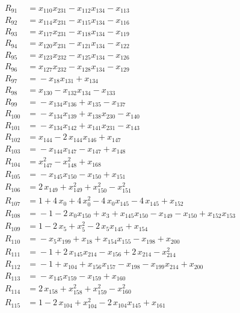 \begin{align*}
R_{91} &={} x_{110} x_{231} -x_{112} x_{134} -x_{113} \\[2pt]
R_{92} &={} x_{114} x_{231} -x_{115} x_{134} -x_{116} \\[2pt]
R_{93} &={} x_{117} x_{231} -x_{118} x_{134} -x_{119} \\[2pt]
R_{94} &={} x_{120} x_{231} -x_{121} x_{134} -x_{122} \\[2pt]
R_{95} &={} x_{123} x_{232} -x_{125} x_{134} -x_{126} \\[2pt]
R_{96} &={} x_{127} x_{232} -x_{128} x_{134} -x_{129} \\[2pt]
R_{97} &={} -x_{18} x_{131} +x_{134} \\[2pt]
R_{98} &={} x_{130} -x_{132} x_{134} -x_{133} \\[2pt]
R_{99} &={} -x_{134} x_{136} +x_{135} -x_{137} \\[2pt]
R_{100} &={} -x_{134} x_{139} +x_{138} x_{230} -x_{140} \\[2pt]
R_{101} &={} -x_{134} x_{142} +x_{141} x_{231} -x_{143} \\[2pt]
R_{102} &={} x_{144} -2\,x_{144} x_{146} +x_{147} \\[2pt]
R_{103} &={} -x_{144} x_{147} -x_{147} +x_{148} \\[2pt]
R_{104} &={} x_{147}^{2} -x_{148}^{2} +x_{168} \\[2pt]
R_{105} &={} -x_{145} x_{150} -x_{150} +x_{151} \\[2pt]
R_{106} &={} 2\,x_{149} +x_{149}^{2} +x_{150}^{2} -x_{151}^{2} \\[2pt]
R_{107} &={} 1 +4\,x_{0} +4\,x_{0}^{2} -4\,x_{0} x_{145} -4\,x_{145} +x_{152} \\[2pt]
R_{108} &={} -1 -2\,x_{0} x_{150} +x_{3} +x_{145} x_{150} -x_{149} -x_{150} +x_{152} x_{153} \\[2pt]
R_{109} &={} 1 -2\,x_{5} +x_{5}^{2} -2\,x_{5} x_{145} +x_{154} \\[2pt]
R_{110} &={} -x_{5} x_{199} +x_{18} +x_{154} x_{155} -x_{198} +x_{200} \\[2pt]
R_{111} &={} -1 +2\,x_{145} x_{214} -x_{156} +2\,x_{214} -x_{214}^{2} \\[2pt]
R_{112} &={} -1 +x_{104} +x_{156} x_{157} -x_{198} -x_{199} x_{214} +x_{200} \\[2pt]
R_{113} &={} -x_{145} x_{159} -x_{159} +x_{160} \\[2pt]
R_{114} &={} 2\,x_{158} +x_{158}^{2} +x_{159}^{2} -x_{160}^{2} \\[2pt]
R_{115} &={} 1 -2\,x_{104} +x_{104}^{2} -2\,x_{104} x_{145} +x_{161} \\[2pt]

\end{align*}

